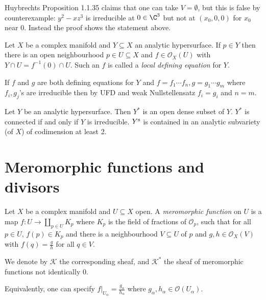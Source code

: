 \documentclass[a4paper]{article}
\begin{document}
\begin{remark}
  Huybrechts Proposition 1.1.35 claims that one can take \(V = \emptyset\), but this is false by counterexample: \(y^2 - xz^3\) is irreducible at \(0 \in \C^3\) but not at \((x_0, 0, 0)\) for \(x_0\) near \(0\). Instead the proof shows the statement above.
\end{remark}

\begin{definition}
  Let \(X\) be a complex manifold and \(Y \subseteq X\) an analytic hypersurface. If \(p \in Y\) then there is an open neighbourhood \(p \in U \subseteq X\) and \(f \in \mathcal O_X(U)\) with \(Y \cap U = f^{-1}(0) \cap U\). Such an \(f\) is called a \emph{local defining equation} for \(Y\).
\end{definition}

If \(f\) and \(g\) are both defining equations for \(Y\) and \(f = f_1 \cdots f_n, g = g_1 \cdots g_m\) where \(f_i, g_j\)'s are irreducible then by UFD and weak Nullstellensatz \(f_i = g_i\) and \(n = m\).

\begin{theorem}
  Let \(Y\) be an analytic hypersurface. Then \(Y^*\) is an open dense subset of \(Y\). \(Y^*\) is connected if and only if \(Y\) is irreducible. \(Y^{\text s}\) is contained in an analytic subvariety (of \(X\)) of codimension at least 2.
\end{theorem}

\section{Meromorphic functions and divisors}

\begin{definition}
  Let \(X\) be a complex manifold and \(U \subseteq X\) open. A \emph{meromorphic function} on \(U\) is a map \(f: U \to \coprod_{p \in U} K_p\) where \(K_p\) is the field of fractions of \(\mathcal O_p\), such that for all \(p \in U\), \(f(p) \in K_p\) and there is a neighbourhood \(V \subseteq U\) of \(p\) and \(g, h \in \mathcal O_X(V)\) with \(f(q) = \frac{g}{h}\) for all \(q \in V\).

  We denote by \(\mathcal K\) the corresponding sheaf, and \(\mathcal K^*\) the sheaf of meromorphic functions not identically \(0\).
\end{definition}

\begin{ex}
  Equivalently, one can specify \(f|_{U_\alpha} = \frac{g_\alpha}{h_\alpha}\) where \(g_\alpha, h_\alpha \in \mathcal O(U_\alpha)\).
\end{ex}
\end{document}
